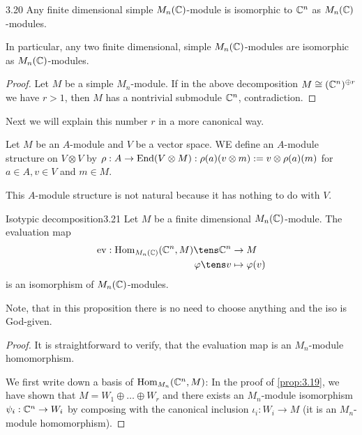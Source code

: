 \documentclass[twoside = false,	%
		headsepline,		%
		parskip = true,
		]{scrbook}						%
\begin{document}
    \begin{corollary}{}{3.20}
        Any finite dimensional simple $M_n(\mathbb C)$-module is isomorphic to $\mathbb C^n$ as $M_n(\mathbb C)$-modules.
    \end{corollary}
    
    In particular, any two finite dimensional, simple $M_n(\mathbb C)$-modules are isomorphic as $M_n(\mathbb C)$-modules.
    
    \begin{proof}
        Let $M$ be a simple $M_n$-module. If in the above decomposition $M\cong(\mathbb C^n)^{\oplus r}$ we have $r>1$, then $M$ has a nontrivial submodule $\mathbb C^n$, contradiction.
    \end{proof}
    
    Next we will explain this number $r$ in a more canonical way.

    Let $M$ be an $A$-module and $V$ be a vector space. WE define an $A$-module structure on $V\otimes V$ by $\rho: A \to \mathrm{End}(V\otimes M): \rho(a)(v\otimes m):= v \otimes \rho(a)(m)$ for $a\in A, v\in V$ and $m\in M$.

    This $A$-module structure is not natural because it has nothing to do with $V$.
    \begin{proposition}{Isotypic decomposition}{3.21}
        Let $M$ be a finite dimensional $M_n(\mathbb C)$-module. The evaluation map
        \begin{equation*}
        \begin{split}
            \ev: \Hom_{M_n(\C)}(\C^n,M) \tens \C^n &\to M \\
            \varphi \tens v &\mapsto \varphi(v)
        \end{split}
        \end{equation*}
        is an isomorphism of $M_n(\mathbb C)$-modules.
    \end{proposition}

    Note, that in this proposition there is no need to choose anything and the iso is God-given.

    \begin{proof}
        It is straightforward to verify, that the evaluation map is an $M_n$-module homomorphism.

    We first write down a basis of $\mathrm{Hom}_{M_n}(\mathbb C^n,M)$: In the proof of \ref{prop:3.19}, we have shown that $M= W_1 \oplus \dots \oplus W_r$ and there exists an $M_n$-module isomorphism $\psi_i: \mathbb C^n\to W_i$ by composing with the canonical inclusion $\iota_i: W_i \to M$ (it is an $M_n$-module homomorphism).
    \end{proof}
    
\end{document}
